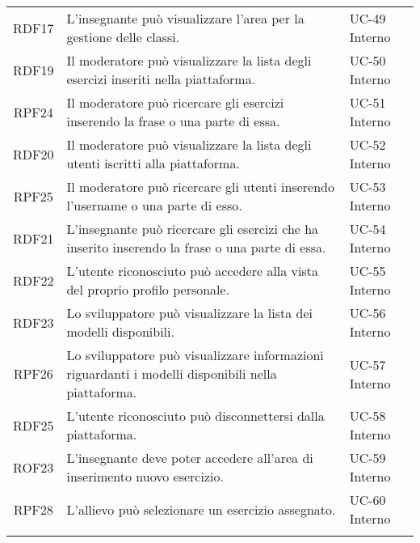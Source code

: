 \begin{tabularx}{\textwidth}{| c | p{10cm} | X |}
		RDF17 & L'insegnante può visualizzare l'area per la gestione delle classi. & UC-49 \newline Interno\\
		RDF19 & Il moderatore può visualizzare la lista degli esercizi inseriti nella piattaforma. & UC-50 \newline Interno\\
		RPF24 & Il moderatore può ricercare gli esercizi inserendo la frase o una parte di essa. & UC-51 \newline Interno\\
		RDF20 & Il moderatore può visualizzare la lista degli utenti iscritti alla piattaforma. & UC-52 \newline Interno\\
		RPF25 & Il moderatore può ricercare gli utenti inserendo l'username o una parte di esso. & UC-53 \newline Interno\\
		RDF21 & L'insegnante può ricercare gli esercizi che ha inserito inserendo la frase o una parte di essa. & UC-54 \newline Interno\\
		RDF22 & L'utente riconosciuto può accedere alla vista del proprio profilo personale. & UC-55 \newline Interno\\
		RDF23 & Lo sviluppatore può visualizzare la lista dei modelli disponibili. & UC-56 \newline Interno\\
		RPF26 & Lo sviluppatore può visualizzare informazioni riguardanti i modelli disponibili nella piattaforma. & UC-57 \newline Interno\\
		RDF25 & L'utente riconosciuto può disconnettersi dalla piattaforma. & UC-58 \newline Interno\\
		ROF23 & L'insegnante deve poter accedere all'area di inserimento nuovo esercizio. & UC-59 \newline Interno\\
		RPF28 & L'allievo può selezionare un esercizio assegnato. & UC-60 \newline Interno\\
		\hline
		\caption{Tabella dei requisiti funzionali}
\end{tabularx}

